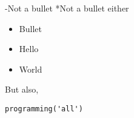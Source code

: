 \documentclass{article}
\begin{document}
-Not a bullet
*Not a bullet either

\begin{itemize}
\item  Bullet
\item  Hello
\item  World

\end{itemize}

But also,


\begin{verbatim}
programming('all')
\end{verbatim}
\end{document}
